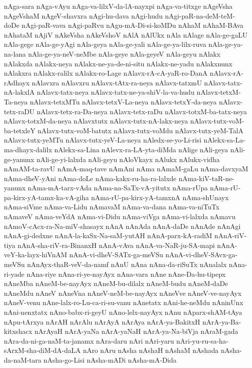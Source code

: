 {nAga-sara
nAga-vAyu
nAga-va-lilxV-da-lA-nayxpi
nAga-va-titxge
nAgeVsha
nAgeVshaM
nAgeV-shavxra
nAgi-hu-dava
nAgi-hudu
nAgi-paR-na-deM-teM-doDe
nAgi-paR-vava
nAgi-paRvu
nAgu-mA-Di-si-koMDu
nAhaM
nAhaM-BAva
nAhataM
nAjiV
nAkeVsha
nAkeVshoV
nAlA
nAlUkx
nAla
nAlage
nAla-ge-gaLU
nAla-gege
nAla-ge-yAgi
nAla-geya
nAla-ge-yali
nAla-ge-ya-lilx-ruva
nAla-ge-ya-na-lana
nAla-ge-ya-neV-neMbe
nAla-geye
nAla-geyeV
nAla-geyu
nAlakx
nAlakxda
nAlakx-neya
nAlakx-ne-ya-de-ni-situ
nAlakx-ne-yadu
nAlakxnunx
nAlakxra
nAlakx-ralilx
nAlakx-ro-Lage
nAlavx-rA-cA-yaR-ro-DanA
nAlavx-rA-rAdhayx
nAlavxra
nAlavxru
nAlavx-tAtx-ra-neya
nAlavx-tatxmU
nAlavx-tatx-nA-lakxlA
nAlavx-tatx-neya
nAlavx-tatx-ne-ya-shiV-la-va-hudu
nAlavx-tetxM-Ta-neya
nAlavx-tetxMTu
nAlavx-tetxV-La-neya
nAlavx-tetxY-da-neya
nAlavx-tetx-raDU
nAlavx-tetx-ra-Da-neya
nAlavx-tetx-raDu
nAlavx-totxM-ba-tatx-neya
nAlavx-totxM-da-neya
nAlavxtutx
nAlavx-tutx-nA-lakx-neya
nAlavx-tutx-voM-ba-tetxleY
nAlavx-tutx-voM-batutx
nAlavx-tutx-voMdu
nAlavx-tutx-yeM-TalA
nAlavx-tutx-yeMTu
nAlavx-tutx-yeV-La-neya
nAledx-se-yo-Li-risi
nAlekx-sa-La-ma-dhayx-dalilx
nAlekx-sa-Lina
nAlevx-ra-LA-yta-diMda
nAlige
nAli-geya
nAli-ge-yanunx
nAli-ge-yi-lalxda
nAli-geyu
nAloVkayx
nAlukx
nAlukx-vidha
nAmAM-ta-ravU
nAmA-maq-tave
nAmAni
nAma
nAmaM-gaLu
nAma-davxyaM
nAma-dheV-yAni
nAma-doLe
nAma-kakx-ru-ha-ra-lalxde
nAma-kiV-taR-ne-yanunx
nAma-mA-tarx-vAda
nAma-na-SaTx-vA-yitutx
nAma-rUpa
nAma-rU-pa-kirx-yA-tamx-ka-vA-giha
nAma-rU-pa-kirx-yA-tamxnA
nAma-shUnayx
nAma-siVme
nAma-va-Lidu
nAmavaM
nAma-va-dana
nAma-va-niTuTx
nAmaveV
nAma-veYdA
nAma-vi-Didu
nAma-viVga
nAma-vi-lalxda
nAmavu
nAmoV-cAcx-ra-Na-miV-shasayx
nAnA
nAnAda
nAnA-daDe
nAnAde
nAnAgi
nAnA-gi-dedxne
nAnA-la-kaSx-Na-saM-yutAH
nAnA-parx-kA-radiM
nAnA-riV-tiya
nAnA-sha-riV-ra-BinanxH
nAnA-vAva
nAnA-va-NaR-ju-SA-mapi
nAnA-veY-ka-layx-hiVnAM
nAnA-vi-dheV-SATx-ga-meVSu
nAnA-vi-dheV-SAvx-ga-meVSu
nAnAyx-thaR-veV-da-namf
nAnU
nAna
nAna-da-riSuTx
nAnalalx
nAna-ri-yade
nAna-riye
nAna-ri-ye-nayAyx
nAna-vara
nAne
nAne-Da-hu-tipepx
nAneMba
nAneM-be-nayAyx
nAneM-bu-dilalx
nAneM-budu
nAneM-daDe
nAneMdu
nAneV
nAneVna
nAneV-neM-be-nayAyx
nAneVve
nAneV-ve-nayAyx
nAneV-venu
nAne-lalx-ro-Lu-ca-ri-su-vanu
nAnetatx
nAni-he-neMdu
nAninUnx
nAni-nenxtatx
nAno-babx-ri-geyU
nAno-lelx-nayAyx
nAnu
nAparx-shAM-tAya
nApu-tArxya
nArAH
nArAlu
nArAyA
nArAya
nArA-ya-BakitxH
nArA-ya-Ba-kitxshacx
nArAyaH
nArA-yaNa
nArA-yaNaH
nArA-ya-Na-biVja
nAraM-gada
nAra-da-ni-ga-naM-ta-janamx
nAra-daru
nAri
nAri-yaru
nAri-yu-ru-sa-ha-sArxM-sha-diM-dA-daLA
nAro
nAru
nAsha
nAshaH
nAshaM
nAshada
nAsha-da-naM-tara
nAsha-go-Lisi
nAsha-mADi
nAsha-mA-Dida
}
